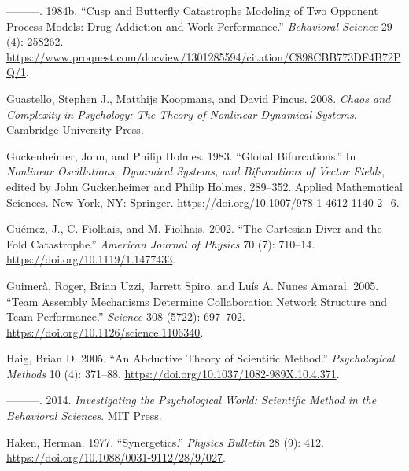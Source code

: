 \documentclass[
  a4paper,
  DIV=11,
  numbers=noendperiod,
  oneside]{scrreprt}
\newlength{\cslhangindent}
\newlength{\cslentryspacingunit} %
\newenvironment{CSLReferences}[2] %
 {%
  \setlength{\parindent}{0pt}
  \ifodd #1
  \let\oldpar\par
  \def\par{\hangindent=\cslhangindent\oldpar}
  \fi
  \setlength{\parskip}{#2\cslentryspacingunit}
 }%
 {}
\begin{document}
\begin{CSLReferences}{1}{0}
\leavevmode{}%
---------. 1984b. {``Cusp and Butterfly Catastrophe Modeling of Two
Opponent Process Models: Drug Addiction and Work Performance.''}
\emph{Behavioral Science} 29 (4): 258262.
\url{https://www.proquest.com/docview/1301285594/citation/C898CBB773DF4B72PQ/1}.

\leavevmode{}%
Guastello, Stephen J., Matthijs Koopmans, and David Pincus. 2008.
\emph{Chaos and {Complexity} in {Psychology}: {The Theory} of {Nonlinear
Dynamical Systems}}. {Cambridge University Press}.

\leavevmode{}%
Guckenheimer, John, and Philip Holmes. 1983. {``Global
{Bifurcations}.''} In \emph{Nonlinear {Oscillations}, {Dynamical
Systems}, and {Bifurcations} of {Vector Fields}}, edited by John
Guckenheimer and Philip Holmes, 289--352. Applied {Mathematical
Sciences}. {New York, NY}: {Springer}.
\url{https://doi.org/10.1007/978-1-4612-1140-2_6}.

\leavevmode{}%
Güémez, J., C. Fiolhais, and M. Fiolhais. 2002. {``The {Cartesian} Diver
and the Fold Catastrophe.''} \emph{American Journal of Physics} 70 (7):
710--14. \url{https://doi.org/10.1119/1.1477433}.

\leavevmode{}%
Guimerà, Roger, Brian Uzzi, Jarrett Spiro, and Luís A. Nunes Amaral.
2005. {``Team {Assembly Mechanisms Determine Collaboration Network
Structure} and {Team Performance}.''} \emph{Science} 308 (5722):
697--702. \url{https://doi.org/10.1126/science.1106340}.

\leavevmode{}%
Haig, Brian D. 2005. {``An Abductive Theory of Scientific Method.''}
\emph{Psychological Methods} 10 (4): 371--88.
\url{https://doi.org/10.1037/1082-989X.10.4.371}.

\leavevmode{}%
---------. 2014. \emph{Investigating the {Psychological World}:
{Scientific Method} in the {Behavioral Sciences}}. {MIT Press}.

\leavevmode{}%
Haken, Herman. 1977. {``Synergetics.''} \emph{Physics Bulletin} 28 (9):
412. \url{https://doi.org/10.1088/0031-9112/28/9/027}.


\end{CSLReferences}
\end{document}
